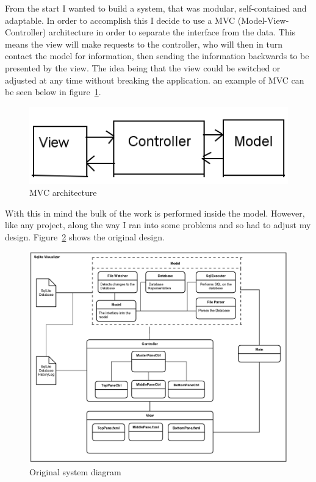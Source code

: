 From the start I wanted to build a system, that was modular, self-contained and adaptable. In order to accomplish this I decide to use a MVC (Model-View-Controller) architecture in order to separate the interface from the data. This means the view will make requests to the controller, who will then in turn contact the model for information, then sending the information backwards to be presented by the view. The idea being that the view could be switched or adjusted at any time without breaking the application. an example of MVC can be seen below in figure~\ref{fig:mvc}.

\begin{figure}[H]
	\centering
	\includegraphics[scale=0.5]{images/mvc.png}
	\caption{MVC architecture}
	\label{fig:mvc}
\end{figure}

With this in mind the bulk of the work is performed inside the model. However, like any project, along the way I ran into some problems and so had to adjust my design. Figure~\ref{fig:design_old} shows the original design.

\begin{figure}[H]
	\centering
	\includegraphics[scale=0.2]{images/system_diagram_old.png}
	\caption{Original system diagram}
	\label{fig:design_old}
\end{figure}

